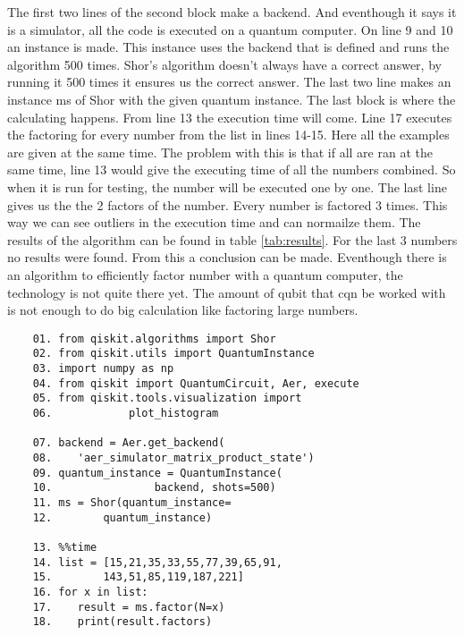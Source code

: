 The first two lines of the second block make a backend. And eventhough it says it is a simulator, all the code is executed on a quantum computer.
On line 9 and 10 an instance is made. This instance uses the backend that is defined and runs the algorithm 500 times. Shor's algorithm doesn't always have a correct answer, by running it 500 times it ensures us the correct answer.
The last two line makes an instance ms of Shor with the given quantum instance.
The last block is where the calculating happens.
From line 13 the execution time will come.
Line 17 executes the factoring for every number from the list in lines 14-15. Here all the examples are given at the same time. The problem with this is that if all are ran at the same time, line 13 would give the executing time of all the numbers combined.
So when it is run for testing, the number will be executed one by one.
The last line gives us the the 2 factors of the number.
Every number is factored 3 times. This way we can see outliers in the execution time and can normailze them.
The results of the algorithm can be found in table \ref{tab:results}. For the last 3 numbers no results were found. 
From this a conclusion can be made. Eventhough there is an algorithm to efficiently factor number with a quantum computer, the technology is not quite there yet.
The amount of qubit that cqn be worked with is not enough to do big calculation like factoring large numbers.

\begin{lstlisting}
    01. from qiskit.algorithms import Shor
    02. from qiskit.utils import QuantumInstance
    03. import numpy as np
    04. from qiskit import QuantumCircuit, Aer, execute
    05. from qiskit.tools.visualization import
    06.            plot_histogram

    07. backend = Aer.get_backend(
    08.    'aer_simulator_matrix_product_state')
    09. quantum_instance = QuantumInstance(
    10.                backend, shots=500)
    11. ms = Shor(quantum_instance=
    12.        quantum_instance)

    13. %%time
    14. list = [15,21,35,33,55,77,39,65,91,
    15.        143,51,85,119,187,221]
    16. for x in list:
    17.    result = ms.factor(N=x)
    18.    print(result.factors)
\end{lstlisting}

